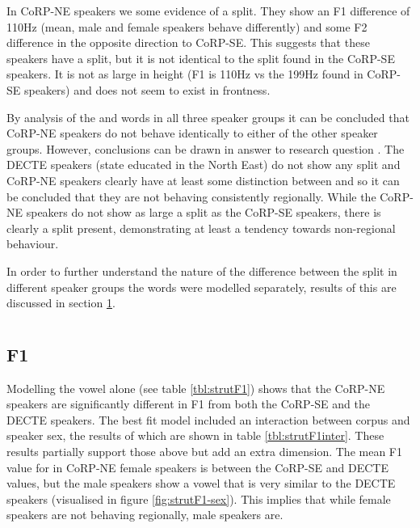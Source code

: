 \documentclass[../../../00.FullDoc/tex/ThesisSkeleton-draft2]{subfiles}
\begin{document}
In CoRP-NE speakers we some evidence of a split. They show an F1 difference of 110Hz (mean, male and female speakers behave differently) and some F2 difference in the opposite direction to CoRP-SE. This suggests that these speakers have a split, but it is not identical to the split found in the CoRP-SE speakers. It is not as large in height (F1 is 110Hz vs the 199Hz found in CoRP-SE speakers) and does not seem to exist in frontness.

By analysis of the \foot{} and \strutt{} words in all three speaker groups it can be concluded that CoRP-NE speakers do not behave identically to either of the other speaker groups. However, conclusions can be drawn in answer to research question \notinsubfile{\ref{RQ1}}. The DECTE speakers (state educated in the North East) do not show any \FS{} split and CoRP-NE speakers clearly have at least some distinction between \foot{} and \strutt{} so it can be concluded that they are not behaving consistently regionally. While the CoRP-NE speakers do not show as large a split as the CoRP-SE speakers, there is clearly a split present, demonstrating at least a tendency towards non-regional behaviour.

In order to further understand the nature of the difference between the split in different speaker groups the \strutt{} words were modelled separately, results of this are discussed in section \ref{sec:FSSTRUT}.

\section{} \label{sec:FSSTRUT}
\subsection{F1}

Modelling the \strutt{} vowel alone (see table \ref{tbl:strutF1}) shows that the CoRP-NE speakers are significantly different in F1 from both the CoRP-SE and the DECTE speakers. The best fit model included an interaction between corpus and speaker sex, the results of which are shown in table \ref{tbl:strutF1inter}. These results partially support those above but add an extra dimension. The mean F1 value for \strutt{} in CoRP-NE female speakers is between the CoRP-SE and DECTE values, but the male speakers show a vowel that is very similar to the DECTE speakers (visualised in figure \ref{fig:strutF1-sex}). This implies that while female speakers are not behaving regionally, male speakers are.
\end{document}
